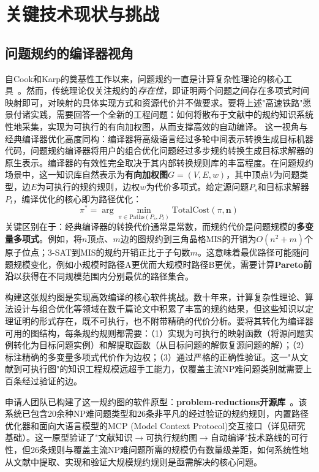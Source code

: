 \section{关键技术现状与挑战}

\subsection{问题规约的编译器视角}

自Cook和Karp的奠基性工作以来，问题规约一直是计算复杂性理论的核心工具~\cite{Lucas2014Frontiers}。然而，传统理论仅关注规约的\emph{存在性}，即证明两个问题之间存在多项式时间映射即可，对映射的具体实现方式和资源代价并不做要求。要将上述"高速铁路"愿景付诸实践，需要回答一个全新的工程问题：如何将散布于文献中的规约知识系统性地采集，实现为可执行的有向加权图，从而支撑高效的自动编译。
这一视角与经典编译器优化高度同构：编译器将高级语言经过多轮中间表示转换生成目标机器代码，问题规约编译器将用户的组合优化问题经过多步规约转换生成目标求解器的原生表示。编译器的有效性完全取决于其内部转换规则库的丰富程度。在问题规约场景中，这一知识库自然表示为\textbf{有向加权图}$G = (V, E, w)$，其中顶点$V$为问题类型，边$E$为可执行的规约规则，边权$w$为代价多项式。给定源问题$P_s$和目标求解器$P_t$，编译优化的核心即为路径优化：
$$
\pi^* = \arg\min_{\pi \in \text{Paths}(P_s, P_t)} \text{TotalCost}(\pi, \mathbf{n})
$$
关键区别在于：经典编译器的转换代价通常是常数，而规约代价是问题规模的\textbf{多变量多项式}。例如，将$n$顶点、$m$边的图规约到三角晶格MIS的开销为$O(n^2 + m)$个原子位点；3-SAT到MIS的规约开销正比于子句数$m$。这意味着最优路径可能随问题规模变化，例如小规模时路径A更优而大规模时路径B更优，需要计算\textbf{Pareto前沿}以获得在不同规模范围内分别最优的路径集合。

构建这张规约图是实现高效编译的核心软件挑战。数十年来，计算复杂性理论、算法设计与组合优化等领域在数千篇论文中积累了丰富的规约结果，但这些知识以定理证明的形式存在，既不可执行，也不附带精确的代价分析。要将其转化为编译器可用的图结构，每条规约规则都需要：（1）实现为可执行的映射函数（将源问题实例转化为目标问题实例）和解提取函数（从目标问题的解恢复源问题的解）；（2）标注精确的多变量多项式代价作为边权；（3）通过严格的正确性验证。这一"从文献到可执行图"的知识工程规模远超手工能力，仅覆盖主流NP难问题类别就需要上百条经过验证的边。

申请人团队已构建了这一规约图的软件原型：\textbf{problem-reductions开源库}~\cite{ProblemReductions2025}。该系统已包含20余种NP难问题类型和26条非平凡的经过验证的规约规则，内置路径优化器和面向大语言模型的MCP (Model Context Protocol)交互接口（详见研究基础）。这一原型验证了"文献知识$\to$可执行规约图$\to$自动编译"技术路线的可行性，但26条规则与覆盖主流NP难问题所需的规模仍有数量级差距，如何系统性地从文献中提取、实现和验证大规模规约规则是亟需解决的核心问题。


